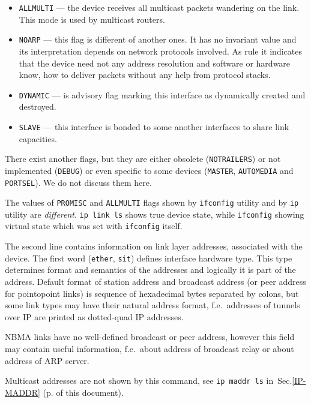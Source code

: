 \begin{itemize}
\item \verb|ALLMULTI| --- the device receives all multicast packets
wandering on the link. This mode is used by multicast routers.

\item \verb|NOARP| --- this flag is different of another ones. It has
no invariant value and its interpretation depends on network protocols
involved. As rule it indicates that the device need not any address
resolution and software or hardware know, how to deliver packets
without any help from protocol stacks.

\item \verb|DYNAMIC| --- is advisory flag marking this interface as
dynamically created and destroyed.

\item \verb|SLAVE| --- this interface is bonded to some another interfaces
to share link capacities.

\end{itemize}

\vskip 1mm
\begin{NB}
There exist another flags, but they are either obsolete (\verb|NOTRAILERS|)
or not implemented (\verb|DEBUG|) or even specific to some devices
(\verb|MASTER|, \verb|AUTOMEDIA| and \verb|PORTSEL|). We do not discuss
them here.
\end{NB}
\begin{NB}
The values of \verb|PROMISC| and \verb|ALLMULTI| flags
shown by \verb|ifconfig| utility and by \verb|ip| utility
are {\em different\/}. \verb|ip link ls| shows true device state,
while \verb|ifconfig| showing virtual state which was set with
\verb|ifconfig| itself.
\end{NB}


The second line contains information on link layer addresses,
associated with the device. The first word (\verb|ether|, \verb|sit|)
defines interface hardware type. This type determines format and semantics
of the addresses and logically it is part of the address.
Default format of station address and broadcast address
(or peer address for pointopoint links) is
sequence of hexadecimal bytes separated by colons, but some link
types may have their natural address format, f.e.\ addresses
of tunnels over IP are printed as dotted-quad IP addresses.

\vskip 1mm
\begin{NB}
  NBMA links have no well-defined broadcast or peer address,
  however this field may contain useful information, f.e.\
  about address of broadcast relay or about address of ARP server.
\end{NB}
\begin{NB}
Multicast addresses are not shown by this command, see
\verb|ip maddr ls| in~Sec.\ref{IP-MADDR} (p.\pageref{IP-MADDR} of this
document).
\end{NB}


